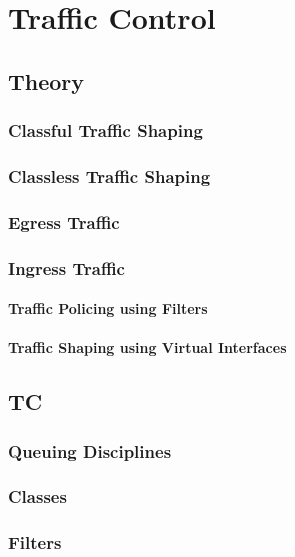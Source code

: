 \chapter{Traffic Control}
\section{Theory}
\subsection{Classful Traffic Shaping}
\subsection{Classless Traffic Shaping}
\subsection{Egress Traffic}
\subsection{Ingress Traffic}
\subsubsection{Traffic Policing using Filters}
\subsubsection{Traffic Shaping using Virtual Interfaces}
\section{TC}
\subsection{Queuing Disciplines}
\subsection{Classes}
\subsection{Filters}